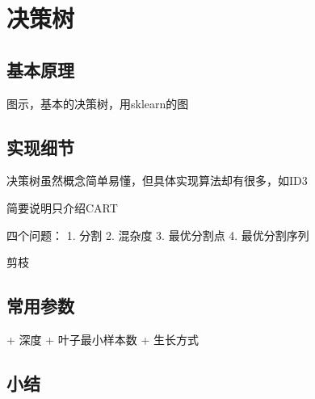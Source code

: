\chapter{决策树}

\section{基本原理}
图示，基本的决策树，用sklearn的图


\section{实现细节}
决策树虽然概念简单易懂，但具体实现算法却有很多，如ID3

简要说明只介绍CART

四个问题：
1. 分割
2. 混杂度
3. 最优分割点
4. 最优分割序列

剪枝

\section{常用参数}
+ 深度
+ 叶子最小样本数
+ 生长方式

\section{小结}
